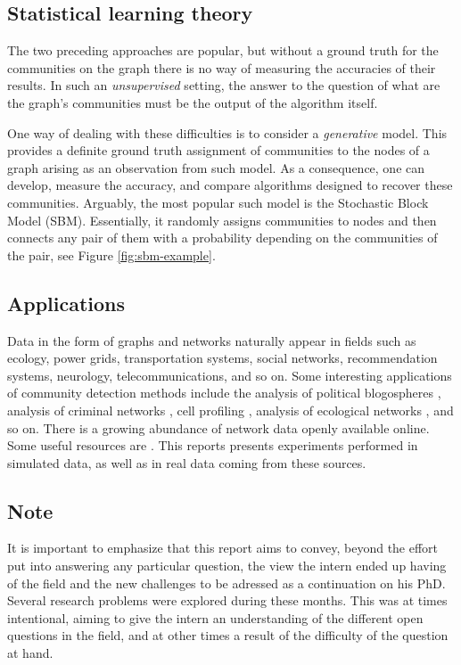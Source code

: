 \documentclass[../../main.tex]{subfiles} %
\begin{document}
\subsection{Statistical learning theory}
The two preceding approaches are popular, but without a ground truth for the 
communities 
on the graph there is no way of measuring the accuracies of their results. In 
such an \textit{unsupervised} setting, the answer to the question of what 
are 
the graph's communities must be the output of the algorithm itself. 

One way of dealing with these difficulties is to consider a \textit{generative} 
model. This provides a definite ground truth assignment of communities to the 
nodes of a graph arising as an observation from such model. As a consequence, 
one can develop, measure the accuracy, and compare algorithms designed to 
recover these communities. Arguably, the most popular such model is the 
Stochastic Block Model (SBM). Essentially, it randomly assigns communities to 
nodes and then connects any pair of them with a probability depending on the 
communities of the pair, see Figure \ref{fig:sbm-example}.

\subsection{Applications}
Data in the form of graphs and networks naturally appear in fields such as 
ecology, power grids, transportation systems, social networks, recommendation 
systems, neurology, telecommunications, and so on. Some interesting 
applications of community detection methods include the analysis of political 
blogospheres \cite{latouche_overlapping_2011}, 
analysis of criminal networks \cite{legramanti_extended_2022}, cell profiling 
\cite{morelli_nested_2021}, analysis of ecological networks 
\cite{miele_revealing_2017}, and so on. There is a growing abundance of 
network data openly available online. Some useful resources are 
\cite{newman-resources, pozo-resources, peixoto-resources, 
stanford-resources}. This reports presents experiments performed in simulated 
data, as well as in real data coming from these sources.

\subsection{Note}
It is important to emphasize that this report aims to convey, beyond the effort 
put into answering any particular question, the view the intern ended up having 
of the field and the new challenges to be adressed as a continuation on his 
PhD. Several research problems were explored during these months. This was at 
times intentional, aiming to give the intern an understanding of the different 
open questions in the field, and at other times a result of the difficulty of 
the question at hand.
\end{document}
